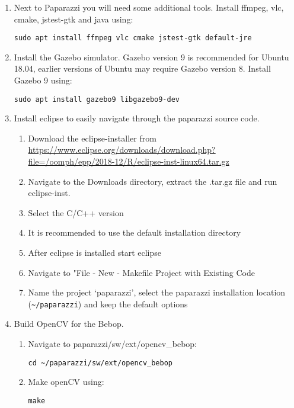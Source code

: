 \begin{enumerate}
	\item Next to Paparazzi you will need some additional tools. Install ffmpeg, vlc, cmake, jstest-gtk and java using:
	\begin{lstlisting}[style=Bash]
		sudo apt install ffmpeg vlc cmake jstest-gtk default-jre
	\end{lstlisting}
	\item Install the Gazebo simulator. Gazebo version 9 is recommended for Ubuntu 18.04, earlier versions of Ubuntu may require Gazebo version 8. Install Gazebo 9 using:
	\begin{lstlisting}[style=Bash]
		sudo apt install gazebo9 libgazebo9-dev
	\end{lstlisting}
	
	\item Install eclipse to easily navigate through the paparazzi source code.
		
	\begin{enumerate}
		\item{Download the eclipse-installer from \url{https://www.eclipse.org/downloads/download.php?file=/oomph/epp/2018-12/R/eclipse-inst-linux64.tar.gz}}
		\item{Navigate to the Downloads directory, extract the .tar.gz file and run eclipse-inst.}
		\item{Select the C/C++ version}
		\item{It is recommended to use the default installation directory}
		\item{After eclipse is installed start eclipse}
		\item{Navigate to "File - New - Makefile Project with Existing Code}
		\item{Name the project `paparazzi', select the paparazzi installation location (\verb|~/paparazzi|) and keep the default options}
	\end{enumerate}
	
	\item Build OpenCV for the Bebop.
	\begin{enumerate}
		\item Navigate to paparazzi/sw/ext/opencv\_bebop:
		\begin{lstlisting}[style=Bash]
			cd ~/paparazzi/sw/ext/opencv_bebop
		\end{lstlisting}
		
		\item Make openCV using:
		\begin{lstlisting}[style=Bash]
			make
		\end{lstlisting}
	\end{enumerate}
\end{enumerate}


